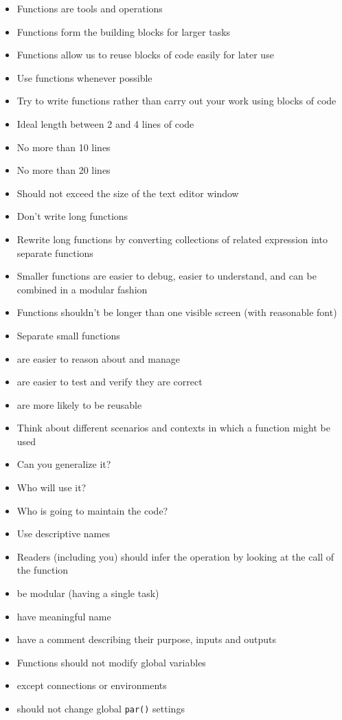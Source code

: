 \documentclass[
]{book}
\providecommand{\tightlist}{%
  \setlength{\itemsep}{0pt}\setlength{\parskip}{0pt}}
\begin{document}
\begin{itemize}
\tightlist
\item
  Functions are tools and operations
\item
  Functions form the building blocks for larger tasks
\item
  Functions allow us to reuse blocks of code easily for later use
\item
  Use functions whenever possible
\item
  Try to write functions rather than carry out your work using blocks of code
\item
  Ideal length between 2 and 4 lines of code
\item
  No more than 10 lines
\item
  No more than 20 lines
\item
  Should not exceed the size of the text editor window
\item
  Don't write long functions
\item
  Rewrite long functions by converting collections of related expression into separate functions
\item
  Smaller functions are easier to debug, easier to understand, and can be combined in a modular fashion
\item
  Functions shouldn't be longer than one visible screen (with reasonable font)
\item
  Separate small functions
\item
  are easier to reason about and manage
\item
  are easier to test and verify they are correct
\item
  are more likely to be reusable
\item
  Think about different scenarios and contexts in which a function might be used
\item
  Can you generalize it?
\item
  Who will use it?
\item
  Who is going to maintain the code?
\item
  Use descriptive names
\item
  Readers (including you) should infer the operation by looking at the call of the function
\item
  be modular (having a single task)
\item
  have meaningful name
\item
  have a comment describing their purpose, inputs and outputs
\item
  Functions should not modify global variables
\item
  except connections or environments
\item
  should not change global \texttt{par()} settings
\end{itemize}
\end{document}
